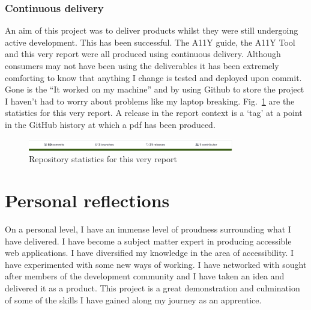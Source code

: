 \subsubsection{Continuous delivery}
An aim of this project was to deliver products whilst they were still
undergoing active development. This has been successful. The A11Y guide, the
A11Y Tool and this very report were all produced using continuous delivery.
Although consumers may not have been using the deliverables it has been
extremely comforting to know that anything I change is tested and deployed
upon commit. Gone is the ``It worked on my machine'' and by using Github to
store the project I haven't had to worry about problems like my laptop
breaking. Fig.~\ref{fig:ghub} are the statistics for this
very report. A release in the report context is a `tag' at a point in the
GitHub history at which a pdf has been produced.

\begin{figure}[H]
\centering
\includegraphics[width=0.8\textwidth]{figures/ghub}
\captionsetup{justification=centering}
\caption{Repository statistics for this very report
\label{fig:ghub}}
\end{figure}

\section{Personal reflections}
On a personal level, I have an immense level of proudness surrounding what I
have delivered. I have become a subject matter expert in producing
accessible web applications. I have diversified my knowledge in the area of
accessibility. I have experimented with some new ways of working. I have
networked with sought after members of the development community and I
have taken an idea and delivered it as a product. This project is a great
demonstration and culmination of some of the skills I have gained along my
journey as an apprentice.
